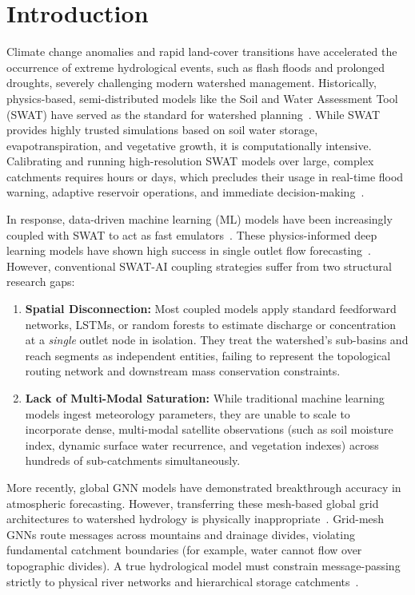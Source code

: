 \documentclass[preprint,12pt]{elsarticle}
\begin{document}
\section{Introduction}
Climate change anomalies and rapid land-cover transitions have accelerated the occurrence of extreme hydrological events, such as flash floods and prolonged droughts, severely challenging modern watershed management. Historically, physics-based, semi-distributed models like the Soil and Water Assessment Tool (SWAT) have served as the standard for watershed planning~\citep{arnold1998large, gassman2007soil, douglas2010soil, arnold2012swat}. While SWAT provides highly trusted simulations based on soil water storage, evapotranspiration, and vegetative growth, it is computationally intensive. Calibrating and running high-resolution SWAT models over large, complex catchments requires hours or days, which precludes their usage in real-time flood warning, adaptive reservoir operations, and immediate decision-making~\citep{moriasi2007model, abbaspour2015integration, neitsch2011soil}.

In response, data-driven machine learning (ML) models have been increasingly coupled with SWAT to act as fast emulators~\citep{shen2018transboundary, shen2021deep, sun2021deep, kratzert2018rainfall, kratzert2019towards, frame2021validation, nearing2021what}. These physics-informed deep learning models have shown high success in single outlet flow forecasting~\citep{karpatne2017theory, read2019process, konapala2020using}. However, conventional SWAT-AI coupling strategies suffer from two structural research gaps:
\begin{enumerate}
    \item \textbf{Spatial Disconnection:} Most coupled models apply standard feedforward networks, LSTMs, or random forests to estimate discharge or concentration at a \textit{single} outlet node in isolation. They treat the watershed's sub-basins and reach segments as independent entities, failing to represent the topological routing network and downstream mass conservation constraints.
    \item \textbf{Lack of Multi-Modal Saturation:} While traditional machine learning models ingest meteorology parameters, they are unable to scale to incorporate dense, multi-modal satellite observations (such as soil moisture index, dynamic surface water recurrence, and vegetation indexes) across hundreds of sub-catchments simultaneously.
\end{enumerate}

More recently, global GNN models have demonstrated breakthrough accuracy in atmospheric forecasting. However, transferring these mesh-based global grid architectures to watershed hydrology is physically inappropriate~\citep{yang2020river}. Grid-mesh GNNs route messages across mountains and drainage divides, violating fundamental catchment boundaries (for example, water cannot flow over topographic divides). A true hydrological model must constrain message-passing strictly to physical river networks and hierarchical storage catchments~\citep{maxwell2014development}.
\end{document}
